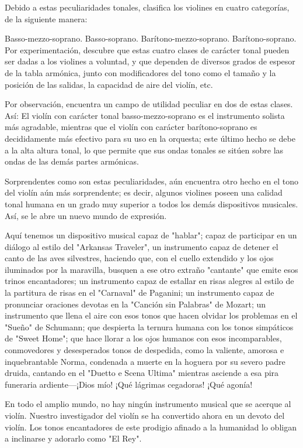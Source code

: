 \documentclass[12pt]{book}
\begin{document}
Debido a estas peculiaridades tonales, clasifica los violines en cuatro categorías, de la siguiente manera:

Basso-mezzo-soprano.
Basso-soprano.
Barítono-mezzo-soprano.
Barítono-soprano.
Por experimentación, descubre que estas cuatro clases de carácter tonal pueden ser dadas a los violines a voluntad, y que dependen de diversos grados de espesor de la tabla armónica, junto con modificadores del tono como el tamaño y la posición de las salidas, la capacidad de aire del violín, etc.

Por observación, encuentra un campo de utilidad peculiar en dos de estas clases. Así: El violín con carácter tonal basso-mezzo-soprano es el instrumento solista más agradable, mientras que el violín con carácter barítono-soprano es decididamente más efectivo para su uso en la orquesta; este último hecho se debe a la alta altura tonal, lo que permite que sus ondas tonales se sitúen sobre las ondas de las demás partes armónicas.

Sorprendentes como son estas peculiaridades, aún encuentra otro hecho en el tono del violín aún más sorprendente; es decir, algunos violines poseen una calidad tonal humana en un grado muy superior a todos los demás dispositivos musicales. Así, se le abre un nuevo mundo de expresión.

Aquí tenemos un dispositivo musical capaz de "hablar"; capaz de participar en un diálogo al estilo del "Arkansas Traveler", un instrumento capaz de detener el canto de las aves silvestres, haciendo que, con el cuello extendido y los ojos iluminados por la maravilla, busquen a ese otro extraño "cantante" que emite esos trinos encantadores; un instrumento capaz de estallar en risas alegres al estilo de la partitura de risas en el "Carnaval" de Paganini; un instrumento capaz de pronunciar oraciones devotas en la "Canción sin Palabras" de Mozart; un instrumento que llena el aire con esos tonos que hacen olvidar los problemas en el "Sueño" de Schumann; que despierta la ternura humana con los tonos simpáticos de "Sweet Home"; que hace llorar a los ojos humanos con esos incomparables, conmovedores y desesperados tonos de despedida, como la valiente, amorosa e inquebrantable Norma, condenada a muerte en la hoguera por su severo padre druida, cantando en el "Duetto e Scena Ultima" mientras asciende a esa pira funeraria ardiente—¡Dios mío! ¡Qué lágrimas cegadoras! ¡Qué agonía!

En todo el amplio mundo, no hay ningún instrumento musical que se acerque al violín. Nuestro investigador del violín se ha convertido ahora en un devoto del violín. Los tonos encantadores de este prodigio afinado a la humanidad lo obligan a inclinarse y adorarlo como "El Rey".
\end{document}
